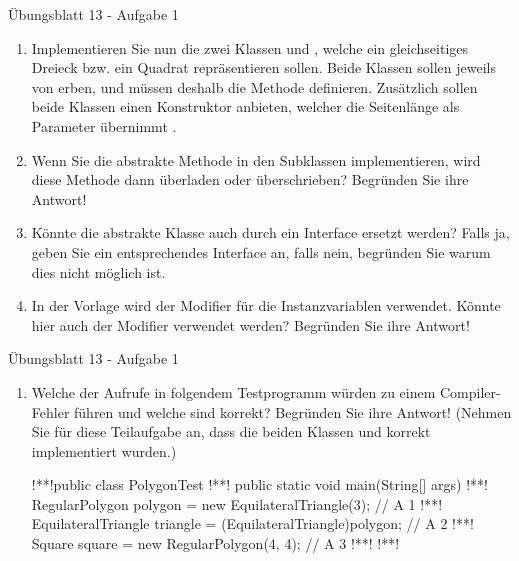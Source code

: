 \begin{frame}[c,fragile]{Übungsblatt 13 - Aufgabe 1}
\small\begin{enumerate}
    \item<2-> Implementieren Sie nun die zwei Klassen  und , welche ein gleichseitiges Dreieck bzw. ein Quadrat repräsentieren sollen. Beide Klassen sollen jeweils von  erben, und müssen deshalb die Methode  definieren. Zusätzlich sollen beide Klassen einen Konstruktor anbieten, welcher die Seitenlänge als Parameter übernimmt .
    \item<3-> Wenn Sie die abstrakte Methode  in den Subklassen implementieren, wird diese Methode dann überladen oder überschrieben? Begründen Sie ihre Antwort!
    \item<4-> Könnte die abstrakte Klasse auch durch ein Interface ersetzt werden? Falls ja, geben Sie ein entsprechendes Interface an, falls nein, begründen Sie warum dies nicht möglich ist.
    \item<5-> In der Vorlage wird der Modifier  für die Instanzvariablen verwendet. Könnte hier auch der Modifier  verwendet werden? Begründen Sie ihre Antwort!
    \end{enumerate}
\end{frame}

\begin{frame}[c,fragile]{Übungsblatt 13 - Aufgabe 1}
\small\begin{enumerate}
    \item<2->[5.] Welche der Aufrufe in folgendem Testprogramm würden zu einem Compiler-Fehler führen und welche sind korrekt? Begründen Sie ihre Antwort!
    (Nehmen Sie für diese Teilaufgabe an, dass die beiden Klassen  und  korrekt implementiert wurden.)
\begin{plainjava}[morekeywords={[3]{PolygonTest,RegularPolygon,EquilateralTriangle,Square}}]
!**!public class PolygonTest {
!**!   public static void main(String[] args) {
!**!      RegularPolygon polygon = new EquilateralTriangle(3); // A 1
!**!      EquilateralTriangle triangle = (EquilateralTriangle)polygon; // A 2
!**!      Square square = new RegularPolygon(4, 4); // A 3
!**!   }
!**!}
\end{plainjava}
    \end{enumerate}
\end{frame}

